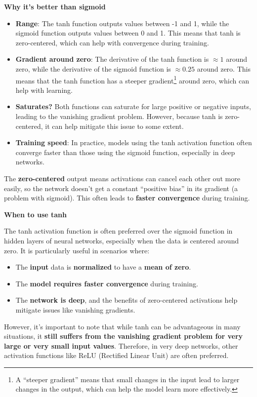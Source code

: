 \highspace
\begin{flushleft}
    \textcolor{Green3}{ \textbf{Why it's better than sigmoid}}
\end{flushleft}
\begin{itemize}
    \item \textbf{Range}: The tanh function outputs values between -1 and 1, while the sigmoid function outputs values between 0 and 1. This means that tanh is zero-centered, which can help with convergence during training.
    \item \textbf{Gradient around zero}: The derivative of the tanh function is $\approx 1$ around zero, while the derivative of the sigmoid function is $\approx 0.25$ around zero. This means that the tanh function has a steeper gradient\footnote{%
        A ``steeper gradient'' means that small changes in the input lead to larger changes in the output, which can help the model learn more effectively.
    } around zero, which can help with learning.
    \item \textbf{Saturates?} Both functions can saturate for large positive or negative inputs, leading to the vanishing gradient problem. However, because tanh is zero-centered, it can help mitigate this issue to some extent.
    \item \textbf{Training speed}: In practice, models using the tanh activation function often converge faster than those using the sigmoid function, especially in deep networks.
\end{itemize}
The \textbf{zero-centered} output means activations can cancel each other out more easily, so the network doesn't get a constant ``positive bias'' in its gradient (a problem with sigmoid). This often leads to \textbf{faster convergence} during training.

\highspace
\begin{flushleft}
    \textcolor{Green3}{ \textbf{When to use tanh}}
\end{flushleft}
The tanh activation function is often preferred over the sigmoid function in hidden layers of neural networks, especially when the data is centered around zero. It is particularly useful in scenarios where:
\begin{itemize}
    \item The \textbf{input} data is \textbf{normalized} to have a \textbf{mean of zero}.
    \item The \textbf{model requires faster convergence} during training.
    \item The \textbf{network is deep}, and the benefits of zero-centered activations help mitigate issues like vanishing gradients.
\end{itemize}
However, it's important to note that while tanh can be advantageous in many situations, it \textbf{still suffers from the vanishing gradient problem for very large or very small input values}. Therefore, in very deep networks, other activation functions like ReLU (Rectified Linear Unit) are often preferred.